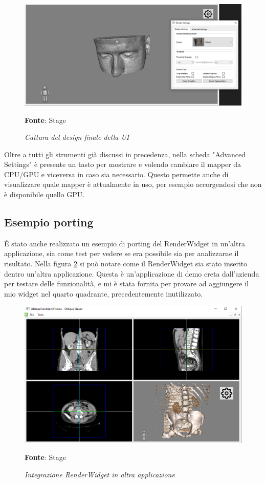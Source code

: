 \begin{figure}[h]
    \centering
    \includegraphics[width=1\textwidth]{immagini/svolgimento/finalnewui.png}
    \caption{\textit{Cattura del design finale della UI}}
    \textbf{Fonte}: Stage
    \label{fig: Final UI}
\end{figure}

Oltre a tutti gli strumenti già discussi in precedenza, nella scheda "Advanced Settings" è presente un tasto per mostrare e volendo cambiare il mapper da CPU/GPU e viceversa in caso sia necessario. Questo permette anche di visualizzare quale mapper è attualmente in uso, per esempio accorgendosi che non è disponibile quello GPU.

\subsection{Esempio porting}
\'E stato anche realizzato un esempio di porting del RenderWidget in un'altra applicazione, sia come test per vedere se era possibile sia per analizzarne il risultato. Nella figura \ref{fig: Porting RenderWidget} si può notare come il RenderWidget sia stato inserito dentro un'altra applicazione. Questa è un'applicazione di demo creta dall'azienda per testare delle funzionalità, e mi è stata fornita per provare ad aggiungere il mio widget nel quarto quadrante, precedentemente inutilizzato.

\begin{figure}[h]
    \centering
    \includegraphics[width=1\textwidth]{immagini/svolgimento/obliqueview.png}
    \caption{\textit{Integrazione RenderWidget in altra applicazione}}
    \textbf{Fonte}: Stage
    \label{fig: Porting RenderWidget}
\end{figure}


